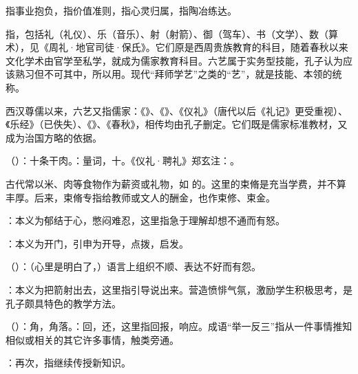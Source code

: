 {
\item {}指事业抱负，指价值准则，指心灵归属，指陶冶练达。

\item {}指，包括礼（礼仪）、乐（音乐）、射（射箭）、御（驾车）、书（文学）、数（算术），见《周礼·地官司徒·保氏》。它们原是西周贵族教育的科目，随着春秋以来文化学术由官学至私学，就成为儒家教育科目。六艺属于实务型技能，孔子认为应该熟习但不可其中，所以用。现代“拜师学艺”之类的“艺”，就是技能、本领的统称。

西汉尊儒以来，六艺又指儒家：《》、《》、《仪礼》（唐代以后《礼记》更受重视）、《乐经》（已佚失）、《》、《春秋》，相传均由孔子删定。它们既是儒家标准教材，又成为治国方略的依据。
}
{}


{
\item {}（）：十条干肉。：量词，十。《仪礼·聘礼》郑玄注：。

古代常以米、肉等食物作为薪资或礼物，如  的。这里的束脩是充当学费，并不算丰厚。后来，束脩专指给教师或文人的酬金，也作束修、束金。
}
{}


{
\item {}：本义为郁结于心，憋闷难忍，这里指急于理解却想不通而有怒。

：本义为开门，引申为开导，点拨，启发。

\item {}（）：（心里是明白了，）语言上组织不顺、表达不好而有怨。

：本义为把箭射出去，这里指引导说出来。营造愤悱气氛，激励学生积极思考，是孔子颇具特色的教学方法。

\item {}（）：角，角落。：回，还，这里指回报，响应。成语“举一反三”指从一件事情推知相似或相关的其它许多事情，触类旁通。
\item {}：再次，指继续传授新知识。
}
{}


